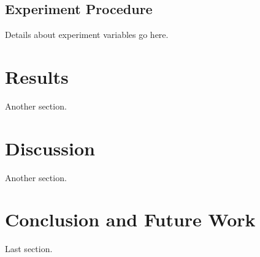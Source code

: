 \documentclass{sig-alternate}
\begin{document}
\subsection{Experiment Procedure}
Details about experiment variables go here.

\section{Results}
Another section.

\section{Discussion}
Another section.

\section{Conclusion and Future Work}
Last section.

%

%
\end{document}
